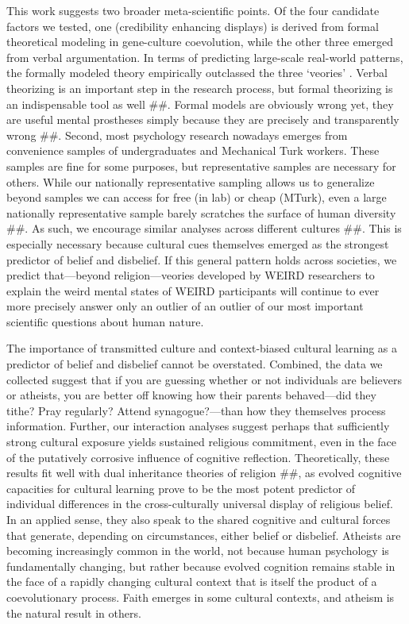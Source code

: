 \documentclass[]{article}
\begin{document}
This work suggests two broader meta-scientific points. Of the four
candidate factors we tested, one (credibility enhancing displays) is
derived from formal theoretical modeling in gene-culture coevolution,
while the other three emerged from verbal argumentation. In terms of
predicting large-scale real-world patterns, the formally modeled theory
empirically outclassed the three `veories' . Verbal theorizing is an
important step in the research process, but formal theorizing is an
indispensable tool as well \#\#. Formal models are obviously wrong yet,
they are useful mental prostheses simply because they are precisely and
transparently wrong \#\#. Second, most psychology research nowadays
emerges from convenience samples of undergraduates and Mechanical Turk
workers. These samples are fine for some purposes, but representative
samples are necessary for others. While our nationally representative
sampling allows us to generalize beyond samples we can access for free
(in lab) or cheap (MTurk), even a large nationally representative sample
barely scratches the surface of human diversity \#\#. As such, we
encourage similar analyses across different cultures \#\#. This is
especially necessary because cultural cues themselves emerged as the
strongest predictor of belief and disbelief. If this general pattern
holds across societies, we predict that---beyond religion---veories
developed by WEIRD researchers to explain the weird mental states of
WEIRD participants will continue to ever more precisely answer only an
outlier of an outlier of our most important scientific questions about
human nature.

The importance of transmitted culture and context-biased cultural
learning as a predictor of belief and disbelief cannot be overstated.
Combined, the data we collected suggest that if you are guessing whether
or not individuals are believers or atheists, you are better off knowing
how their parents behaved---did they tithe? Pray regularly? Attend
synagogue?---than how they themselves process information. Further, our
interaction analyses suggest perhaps that sufficiently strong cultural
exposure yields sustained religious commitment, even in the face of the
putatively corrosive influence of cognitive reflection. Theoretically,
these results fit well with dual inheritance theories of religion \#\#,
as evolved cognitive capacities for cultural learning prove to be the
most potent predictor of individual differences in the cross-culturally
universal display of religious belief. In an applied sense, they also
speak to the shared cognitive and cultural forces that generate,
depending on circumstances, either belief or disbelief. Atheists are
becoming increasingly common in the world, not because human psychology
is fundamentally changing, but rather because evolved cognition remains
stable in the face of a rapidly changing cultural context that is itself
the product of a coevolutionary process. Faith emerges in some cultural
contexts, and atheism is the natural result in others.
\end{document}

